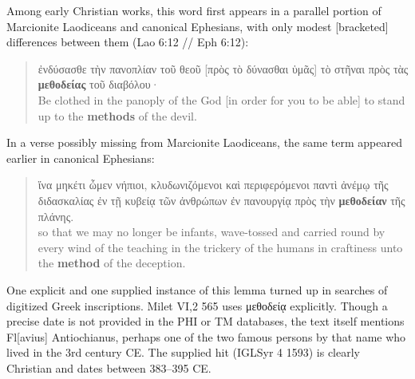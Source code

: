 Among early Christian works, %
this word first appears in a parallel portion of Marcionite Laodiceans and %
canonical Ephesians, with only modest [bracketed] %
differences between them (Lao 6:12 // Eph 6:12):  

\vspace*{3mm} 
 \begin{quote} ἐνδύσασθε τὴν πανοπλίαν τοῦ θεοῦ %
 [πρὸς τὸ δύνασθαι ὑμᾶς] τὸ στῆναι πρὸς τὰς \textbf{μεθοδείας} τοῦ διαβόλου· \\[1mm] %
 Be clothed in the panoply of the God [in order for you to be able] to stand %
 up to the \textbf{methods} of the devil. 
 \end{quote} %
 \vspace*{3mm}

\noindent{}In a verse possibly missing from Marcionite Laodiceans, %
the same term appeared earlier in canonical Ephesians:  

\vspace*{3mm} 
 \begin{quote}ἵνα μηκέτι ὦμεν νήπιοι, %
 κλυδωνιζόμενοι καὶ περιφερόμενοι παντὶ ἀνέμῳ %
 τῆς διδασκαλίας ἐν τῇ κυβείᾳ τῶν ἀνθρώπων ἐν πανουργίᾳ %
 πρὸς τὴν \textbf{μεθοδείαν} τῆς πλάνης. \\[1.5mm] %
 so that we may no longer be infants, %
 wave-tossed and carried round by every wind %
 of the teaching in the trickery of the humans %
 in craftiness unto the \textbf{method} of the deception. \end{quote} %
 \vspace*{3mm}

 One explicit and one supplied instance of this lemma turned up in searches of digitized Greek inscriptions. %
 Milet VI,2 565 uses μεθοδείᾳ explicitly. %
 Though a precise date is not provided in the PHI or TM databases, %
 the text itself mentions Fl[avius] Antiochianus, %
 perhaps one of the two famous persons by that name who lived in the 3rd century CE. %
 The supplied hit (IGLSyr 4 1593) is clearly Christian and dates between 383--395 CE. %

